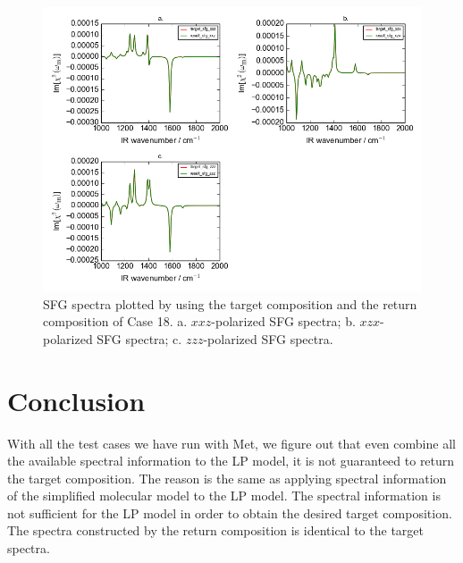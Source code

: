 \begin{figure}[!ht] 
\centering
\includegraphics[scale=0.7]{Figures/chapter4_result_target_plotting_500datapoint_sfg_version2.png}
\caption{SFG spectra plotted by using the target composition and the return composition of Case 18. a. $xxz$-polarized SFG spectra; b. $xzx$-polarized SFG spectra; c. $zzz$-polarized SFG spectra.} \label{fig:4.7}
\end{figure} 

\section{Conclusion}
With all the test cases we have run with Met, we figure out that even combine all the available spectral information to the LP model, it is not guaranteed to return the target composition. The reason is the same as applying spectral information of the simplified molecular model to the LP model. The spectral information is not sufficient for the LP model in order to obtain the desired target composition. The spectra constructed by the return composition is identical to the target spectra. 








